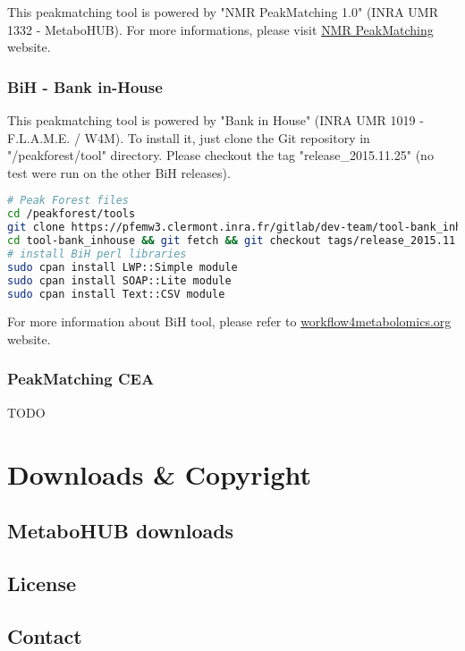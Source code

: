 This peakmatching tool is powered by "NMR PeakMatching 1.0" (\textcopyright INRA UMR 1332 - MetaboHUB). 
For more informations, please visit \href{http://www.bordeaux.inra.fr/pmb/PM/webapp}{NMR PeakMatching} website.

\subsubsection{BiH - Bank in-House}

This peakmatching tool is powered by "Bank in House" (\textcopyright INRA UMR 1019 - F.L.A.M.E. / W4M). 
To install it, just clone the Git repository in "/peakforest/tool" directory. 
Please checkout the tag "release\_2015.11.25" (no test were run on the other BiH releases).

\begin{lstlisting}[language=bash,caption={Install BiH tool},frame=bt]
# Peak Forest files
cd /peakforest/tools
git clone https://pfemw3.clermont.inra.fr/gitlab/dev-team/tool-bank_inhouse.git
cd tool-bank_inhouse && git fetch && git checkout tags/release_2015.11.25
# install BiH perl libraries
sudo cpan install LWP::Simple module
sudo cpan install SOAP::Lite module
sudo cpan install Text::CSV module
\end{lstlisting}

For more information about BiH tool, please refer to \href{http://galaxy.workflow4metabolomics.org/root?tool_id=toolshed4metabolomics.sb-roscoff.fr:9009/repos/pfem/bank_inhouse/bank_inhouse/1.0.0}{workflow4metabolomics.org} website.

\subsubsection{PeakMatching CEA}

TODO

\section{Downloads \& Copyright}

\subsection{MetaboHUB downloads}

\subsection{License}

\subsection{Contact}

\newpage
\newpage


%
%


